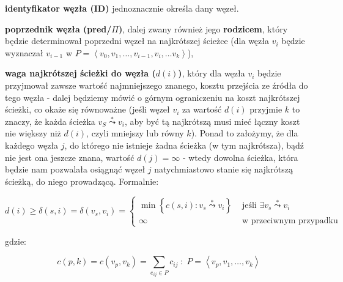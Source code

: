 \begin{myitemize}

\item \textbf{identyfikator węzła (ID)} jednoznacznie określa dany węzeł.

\item \textbf{poprzednik węzła (pred/$\Pi$)}, dalej zwany również jego \textbf{rodzicem}, który będzie determinował poprzedni węzeł na najkrótszej ścieżce (dla węzła $v_{i}$ będzie wyznaczał $v_{i-1}$ w $P = \left \langle v_{0}, v_{1}, \ldots, v_{i-1}, v_{i}, \ldots v_{k} \right \rangle $),

\item \textbf{waga najkrótszej ścieżki do węzła ($d \left( i \right) $)}, który dla węzła $v_{i}$ będzie przyjmował zawsze wartość najmniejszego znanego, kosztu przejścia ze źródła do tego węzła - dalej będziemy mówić o górnym ograniczeniu na koszt najkrótszej ścieżki, co okaże się równoważne (jeśli węzeł $v_{i}$ za wartość $ d \left( i \right) $ przyjmie $k$ to znaczy, że każda ścieżka $v_{S} \overset{*}\leadsto v_{i}$, aby być tą najkrótszą musi mieć łączny koszt nie większy niż $ d \left( i \right) $, czyli mniejszy lub równy $k$). Ponad to założymy, że dla każdego węzła $j$, do którego nie istnieje żadna ścieżka (w tym najkrótsza), bądź nie jest ona jeszcze znana, wartość $d \left( j \right) = \infty$ - wtedy dowolna ścieżka, która będzie nam pozwalała osiągnąć węzeł $j$ natychmiastowo stanie się najkrótszą ścieżką, do niego prowadzącą. Formalnie:

\begin{equation}
	d \left( i \right) \geqslant \delta \left ( s, i \right ) = \delta \left ( v_{s}, v_{i} \right ) = 
	\begin{cases}
	 \min \left\{ c \left( s,i \right ) : v_{s} \overset{*}\leadsto v_{i} \right\} & \text{ jeśli } \exists v_{s} \overset{*}\leadsto v_{i} \\ 
	 \infty & \text{ w przeciwnym przypadku }
	\end{cases}
\end{equation}

gdzie:

\begin{equation}
c \left( p,k \right ) = c \left( v_{p}, v_{k} \right ) = \sum_{e_{ij} \in P} c_{ij} \; : \; P = \left \langle v_{p}, v_{1}, \ldots, v_{k} \right \rangle 
\end{equation}\label{eq:sumCost}

\end{myitemize}


